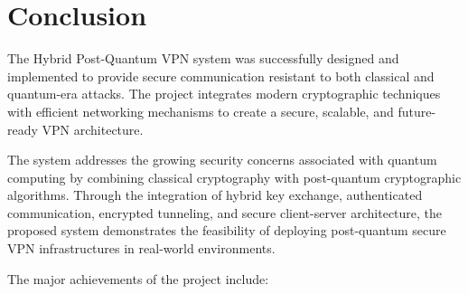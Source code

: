
\section{Conclusion}

The Hybrid Post-Quantum VPN system was successfully designed and implemented to provide secure communication resistant to both classical and quantum-era attacks. The project integrates modern cryptographic techniques with efficient networking mechanisms to create a secure, scalable, and future-ready VPN architecture.

The system addresses the growing security concerns associated with quantum computing by combining classical cryptography with post-quantum cryptographic algorithms. Through the integration of hybrid key exchange, authenticated communication, encrypted tunneling, and secure client-server architecture, the proposed system demonstrates the feasibility of deploying post-quantum secure VPN infrastructures in real-world environments.

The major achievements of the project include:

